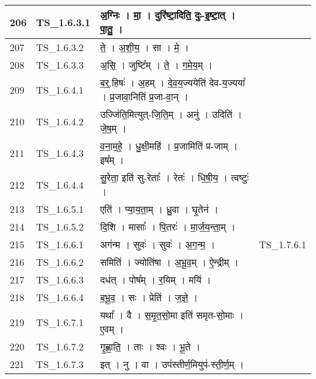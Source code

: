 \documentclass[17pt]{extarticle}
\begin{document}
\begin{longtable}{||p{0.4in}||p{0.9in}||p{4.0in}||p{0.9in}||}
        \hline
            206 & TS\_1.6.3.1 & अ॒ग्निः   ।   मा॒   ।   दुरि॑ष्टा॒दिति॒ दुः{-}इ॒ष्टा॒त्   ।   पा॒तु॒   ।    &      \\
        \hline
            207 & TS\_1.6.3.2 & ते॒   ।   अ॒शी॒य॒   ।   सा   ।   मे॒   ।    &      \\
        \hline
            208 & TS\_1.6.3.3 & अ॒सि॒   ।   जुष्टि᳚म्   ।   ते॒   ।   ग॒मे॒य॒म्   ।    &      \\
        \hline
            209 & TS\_1.6.4.1 & ब॒र्॒.हिषः॑   ।   अ॒हम्   ।   दे॒व॒य॒ज्ययेति॑ देव{-}य॒ज्यया᳚   ।   प्र॒जावा॒निति॑ प्र॒जा{-}वा॒न्   ।    &      \\
        \hline
            210 & TS\_1.6.4.2 & उज्जि॑ति॒मित्युत्{-}जि॒ति॒म्   ।   अनु॑   ।   उदिति॑   ।   जे॒ष॒म्   ।    &      \\
        \hline
            211 & TS\_1.6.4.3 & व॒ना॒म॒हे॒   ।   धु॒क्षी॒महि॑   ।   प्र॒जामिति॑ प्र{-}जाम्   ।   इष᳚म्   ।    &      \\
        \hline
            212 & TS\_1.6.4.4 & सु॒रेता॒ इति॑ सु{-}रेताः᳚   ।   रेतः॑   ।   धि॒षी॒य॒   ।   त्वष्टुः॑   ।    &      \\
        \hline
            213 & TS\_1.6.5.1 & एति॑   ।   प्या॒य॒ता॒म्   ।   ध्रु॒वा   ।   घृ॒तेन॑   ।    &      \\
        \hline
            214 & TS\_1.6.5.2 & दि॒शि   ।   मासाः᳚   ।   पि॒तरः॑   ।   मा॒र्ज॒य॒न्ता॒म्   ।    &      \\
        \hline
            215 & TS\_1.6.6.1 & अग॑न्म   ।   सुवः॑   ।   सुवः॑   ।   अ॒ग॒न्म॒   ।    &  TS\_1.7.6.1       \\
        \hline
            216 & TS\_1.6.6.2 & समिति॑   ।   ज्योति॑षा   ।   अ॒भू॒व॒म्   ।   ऐ॒न्द्रीम्   ।    &      \\
        \hline
            217 & TS\_1.6.6.3 & दध॑त्   ।   पोष᳚म्   ।   र॒यिम्   ।   मयि॑   ।    &      \\
        \hline
            218 & TS\_1.6.6.4 & ब॒भू॒व॒   ।   सः   ।   प्रेति॑   ।   ज॒ज्ञे॒   ।    &      \\
        \hline
            219 & TS\_1.6.7.1 & यथा᳚   ।   वै   ।   स॒मृ॒त॒सो॒मा इति॑ समृत{-}सो॒माः   ।   ए॒वम्   ।    &      \\
        \hline
            220 & TS\_1.6.7.2 & गृ॒ह्णा॒ति॒   ।   ताः   ।   श्वः   ।   भू॒ते   ।    &      \\
        \hline
            221 & TS\_1.6.7.3 & इत्   ।   नु   ।   वा   ।   उप॑स्तीर्ण॒मियुप॑{-}स्ती॒र्ण॒म्   ।    &      \\

\end{longtable}
\end{document}
